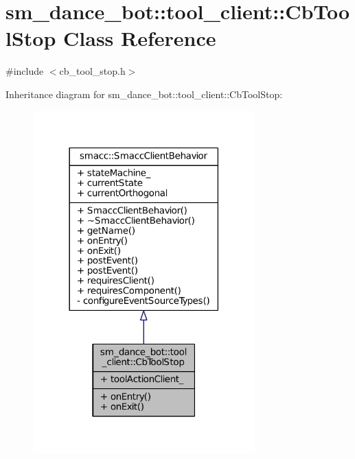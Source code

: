 \hypertarget{classsm__dance__bot_1_1tool__client_1_1CbToolStop}{}\section{sm\+\_\+dance\+\_\+bot\+:\+:tool\+\_\+client\+:\+:Cb\+Tool\+Stop Class Reference}
\label{classsm__dance__bot_1_1tool__client_1_1CbToolStop}


{\ttfamily \#include $<$cb\+\_\+tool\+\_\+stop.\+h$>$}



Inheritance diagram for sm\+\_\+dance\+\_\+bot\+:\+:tool\+\_\+client\+:\+:Cb\+Tool\+Stop\+:
\nopagebreak
\begin{figure}[H]
\begin{center}
\leavevmode
\includegraphics[width=242pt]{classsm__dance__bot_1_1tool__client_1_1CbToolStop__inherit__graph}
\end{center}
\end{figure}


